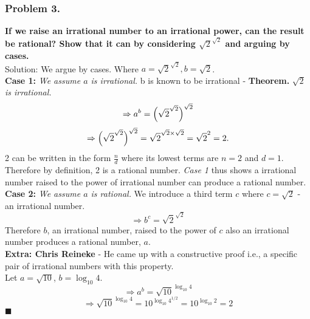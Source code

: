 \documentclass{article}
\begin{document}
\subsubsection{Problem 3.}
\textbf{If we raise an irrational number to an irrational power, can the result be rational? Show that it can by considering $\sqrt{2}^{\sqrt{2}}$ and arguing by cases.}
\\[5pt]
Solution: We argue by cases. Where \(a = \sqrt{2}^{\sqrt{2}}, b = \sqrt{2}\).
\\[5pt]
\textbf{Case 1:} \textit{We assume $a$ is irrational.}
b is known to be irrational - \textbf{Theorem.} \textit{$\sqrt{2}$ is irrational.} 
\[\Rightarrow a^{b} = \Bigl(\sqrt{2}^{\sqrt{2}}\Bigr)^{\sqrt{2}}\]
\[\Rightarrow \Bigl(\sqrt{2}^{\sqrt{2}}\Bigr)^{\sqrt{2}} = \sqrt{2}^{\sqrt{2} \times \sqrt{2}} = \sqrt{2}^{2} = 2.\]
2 can be written in the form $\frac{n}{d}$ where its lowest terms are $n = 2$ and $d = 1$. Therefore by definition, 2 is a rational number. \textit{Case 1} thus shows a irrational number raised to the power of irrational number can produce a rational number.
\\[5pt]
\noindent
\textbf{Case 2:} \textit{We assume $a$ is rational.} We introduce a third term $c$ where $c = \sqrt{2}$ - an irrational number. 
\[\Rightarrow b^{c} = \sqrt{2}^{\sqrt{2}}\]
Therefore $b$, an irrational number, raised to the power of $c$ also an irrational number produces a rational number, $a$.
\\[5pt]
\noindent
\textbf{Extra: Chris Reineke} - He came up with a constructive proof i.e., a specific pair of irrational numbers with this property. 
\\[5pt]
\noindent
Let $a = \sqrt{10}$,  $b = \log_{10}4$.
\[\Rightarrow a^{b} = \sqrt{10}^{\log_{10}4}\]
\[\Rightarrow \sqrt{10}^{\log_{10}4} = 10^{\log_{10}4^{1/2}} = 10^{\log_{10}2} = 2\]
$ \blacksquare $
\end{document}
